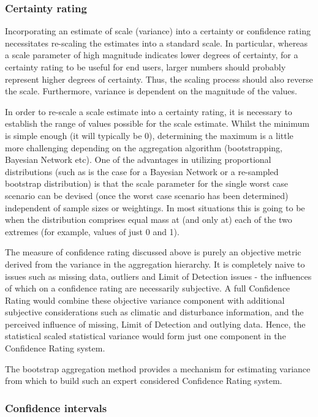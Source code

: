 \documentclass[
  8pt,
  a4paper]{article}
\begin{document}
\subsubsection{Certainty rating}\label{certainty-rating}

Incorporating an estimate of scale (variance) into a certainty or
confidence rating necessitates re-scaling the estimates into a standard
scale. In particular, whereas a scale parameter of high magnitude
indicates lower degrees of certainty, for a certainty rating to be
useful for end users, larger numbers should probably represent higher
degrees of certainty. Thus, the scaling process should also reverse the
scale. Furthermore, variance is dependent on the magnitude of the
values.

In order to re-scale a scale estimate into a certainty rating, it is
necessary to establish the range of values possible for the scale
estimate. Whilst the minimum is simple enough (it will typically be 0),
determining the maximum is a little more challenging depending on the
aggregation algorithm (bootstrapping, Bayesian Network etc). One of the
advantages in utilizing proportional distributions (such as is the case
for a Bayesian Network or a re-sampled bootstrap distribution) is that
the scale parameter for the single worst case scenario can be devised
(once the worst case scenario has been determined) independent of sample
sizes or weightings. In most situations this is going to be when the
distribution comprises equal mass at (and only at) each of the two
extremes (for example, values of just 0 and 1).

The measure of confidence rating discussed above is purely an objective
metric derived from the variance in the aggregation hierarchy. It is
completely naive to issues such as missing data, outliers and Limit of
Detection issues - the influences of which on a confidence rating are
necessarily subjective. A full Confidence Rating would combine these
objective variance component with additional subjective considerations
such as climatic and disturbance information, and the perceived
influence of missing, Limit of Detection and outlying data. Hence, the
statistical scaled statistical variance would form just one component in
the Confidence Rating system.

The bootstrap aggregation method provides a mechanism for estimating
variance from which to build such an expert considered Confidence Rating
system.

\subsubsection{Confidence intervals}\label{confidence-intervals}
\end{document}
